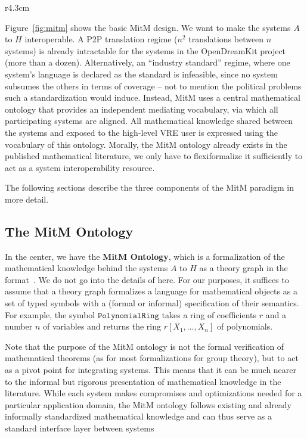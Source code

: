 \begin{wrapfigure}r{4.3cm}\vspace*{-2em}
  \vspace*{-1em}
  \caption{MitM Paradigm}\label{fig:mitm}\vspace*{-1.5em}
\end{wrapfigure}
Figure~\ref{fig:mitm} shows the basic MitM design.
We want to make the systems $A$ to $H$ interoperable.
A P2P translation regime ($n^2$ translations between $n$ systems) is already intractable for the systems in the OpenDreamKit project (more than a dozen).
Alternatively, an ``industry standard'' regime, where one system's language is declared as the standard is infeasible, since no system subsumes the others in terms of coverage -- not to mention the political problems such a standardization would induce.
Instead, MitM uses a central mathematical ontology that provides an independent mediating vocabulary, via which all participating systems are aligned.
All mathematical knowledge shared between the systems and exposed to the high-level VRE user is expressed using the vocabulary of this ontology. 
Morally, the MitM ontology already exists in the published mathematical literature, we only have to flexiformalize it sufficiently to act as a system interoperability resource. 

The following sections describe the three components of the MitM paradigm in more detail.

\subsection{The MitM Ontology}\label{sec:mitm:recap}

In the center, we have the \textbf{MitM Ontology}, which is a formalization of
the mathematical knowledge behind the systems $A$ to $H$ as a theory graph in
the \OMMT format~\cite{Kohlhase:OMDoc1.2,RabKoh:WSMSML13,uniformal:on}. We do
not go into the details of \OMMT here. For our purposes, it
suffices to assume that a theory graph formalizes a language for mathematical objects as a set of typed symbols with a (formal or informal) specification of their semantics.
For example, the symbol $\mathtt{PolynomialRing}$ takes a ring of coefficients $r$ and a number $n$ of variables and returns the ring $r[X_1,\ldots,X_n]$ of polynomials.

Note that the purpose of the MitM ontology is not the formal verification of
mathematical theorems (as for most formalizations
 for group theory), but to act as a pivot point for
integrating systems. This means that it can be much nearer to the informal but
rigorous presentation of mathematical knowledge in the literature. While each
system makes compromises and optimizations needed for a particular application
domain, the MitM ontology follows existing and already informally standardized
mathematical knowledge and can thus serve as a standard interface layer between
systems

